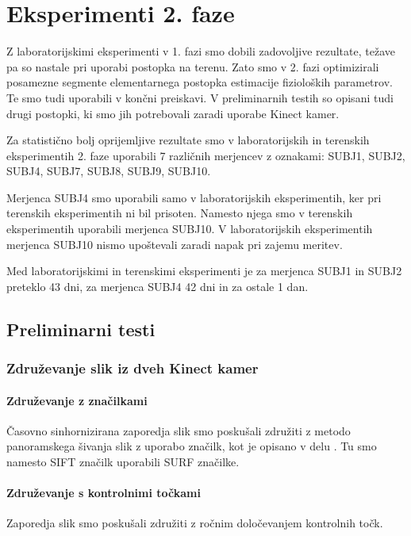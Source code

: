 \section{Eksperimenti 2. faze}
Z laboratorijskimi eksperimenti v 1. fazi smo dobili zadovoljive rezultate, težave pa so nastale pri uporabi postopka na terenu. Zato smo v 2. fazi optimizirali posamezne segmente elementarnega postopka estimacije fizioloških parametrov. Te smo tudi uporabili v končni preiskavi. V preliminarnih testih so opisani tudi drugi postopki, ki smo jih potrebovali zaradi uporabe Kinect kamer.

Za statistično bolj oprijemljive rezultate smo v laboratorijskih in terenskih eksperimentih 2. faze uporabili 7 različnih merjencev z oznakami: SUBJ1, SUBJ2, SUBJ4, SUBJ7, SUBJ8, SUBJ9, SUBJ10. 

Merjenca SUBJ4 smo uporabili samo v laboratorijskih eksperimentih, ker pri terenskih eksperimentih ni bil prisoten. Namesto njega smo v terenskih eksperimentih uporabili merjenca SUBJ10. V laboratorijskih eksperimentih merjenca SUBJ10 nismo upoštevali zaradi napak pri zajemu meritev.

Med laboratorijskimi in terenskimi eksperimenti je za merjenca SUBJ1 in SUBJ2 preteklo 43 dni, za merjenca SUBJ4 42 dni in za ostale 1 dan.  

\subsection{Preliminarni testi}
\subsubsection{Združevanje slik iz dveh Kinect kamer}\label{sec:zdruzevanje}

\paragraph{Združevanje z značilkami}
Časovno sinhornizirana zaporedja slik smo poskušali združiti z metodo panoramskega šivanja slik z uporabo značilk, kot je opisano v delu \cite{brown2007automatic}. Tu smo namesto SIFT značilk uporabili SURF značilke.


\paragraph{Združevanje s kontrolnimi točkami}
Zaporedja slik smo poskušali združiti z ročnim določevanjem kontrolnih točk.


